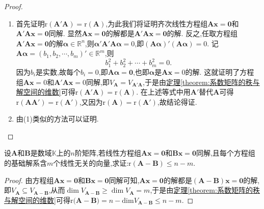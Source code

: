 \documentclass[lang=cn,newtx,10pt,scheme=chinese]{elegantbook}
\begin{document}
\begin{proof}
\begin{enumerate}[(1)]
\item 首先证明\(\mathrm{r}(\boldsymbol{A}'\boldsymbol{A})=\mathrm{r}(\boldsymbol{A})\),为此我们将证明齐次线性方程组\(\boldsymbol{A}\boldsymbol{x}=\boldsymbol{0}\)和\(\boldsymbol{A}'\boldsymbol{A}\boldsymbol{x}=\boldsymbol{0}\)同解. 显然\(\boldsymbol{A}\boldsymbol{x}=\boldsymbol{0}\)的解都是\(\boldsymbol{A}'\boldsymbol{A}\boldsymbol{x}=\boldsymbol{0}\)的解. 反之,任取方程组\(\boldsymbol{A}'\boldsymbol{A}\boldsymbol{x}=\boldsymbol{0}\)的解\(\boldsymbol{\alpha}\in\mathbb{R}^n\),则\(\boldsymbol{\alpha}'\boldsymbol{A}'\boldsymbol{A}\boldsymbol{\alpha}=0\),即\((\boldsymbol{A}\boldsymbol{\alpha})'(\boldsymbol{A}\boldsymbol{\alpha}) = 0\). 记\(\boldsymbol{A}\boldsymbol{\alpha}=(b_1,b_2,\cdots,b_m)'\in\mathbb{R}^m\),则
\[
b_1^2 + b_2^2+\cdots + b_m^2 = 0.
\]
因为\(b_i\)是实数,故每个\(b_i = 0\),即\(\boldsymbol{A}\boldsymbol{\alpha}=\boldsymbol{0}\),也即\(\boldsymbol{\alpha}\)是\(\boldsymbol{A}\boldsymbol{x}=0\)的解. 这就证明了方程组\(\boldsymbol{A}\boldsymbol{x}=0\)和\(\boldsymbol{A}'\boldsymbol{A}\boldsymbol{x}=0\)同解,即\(V_{\boldsymbol{A}}=V_{\boldsymbol{A}'\boldsymbol{A}}\),于是由\hyperref[theorem:系数矩阵的秩与解空间的维数]{定理\ref{theorem:系数矩阵的秩与解空间的维数}}可得\(\mathrm{r}(\boldsymbol{A}'\boldsymbol{A})=\mathrm{r}(\boldsymbol{A})\). 在上述等式中用\(\boldsymbol{A}'\)替代\(\boldsymbol{A}\)可得\(\mathrm{r}(\boldsymbol{A}\boldsymbol{A}')=\mathrm{r}(\boldsymbol{A}')\),又因为\(\mathrm{r}(\boldsymbol{A})=\mathrm{r}(\boldsymbol{A}')\),故结论得证.
        
\item 由(1)类似的方法可以证明.
\end{enumerate}
\end{proof}

\begin{example}
设\(\boldsymbol{A}\)和\(\boldsymbol{B}\)是数域\(\mathbb{K}\)上的\(n\)阶矩阵,若线性方程组\(\boldsymbol{A}\boldsymbol{x}=\boldsymbol{0}\)和\(\boldsymbol{B}\boldsymbol{x}=\boldsymbol{0}\)同解,且每个方程组的基础解系含\(m\)个线性无关的向量,求证:\(\mathrm{r}(\boldsymbol{A}-\boldsymbol{B})\leq n - m\).
\end{example}
\begin{proof}
由方程组\(\boldsymbol{A}\boldsymbol{x}=\boldsymbol{0}\)和\(\boldsymbol{B}\boldsymbol{x}=\boldsymbol{0}\)同解可知,\(\boldsymbol{A}\boldsymbol{x}=\boldsymbol{0}\)的解都是\((\boldsymbol{A}-\boldsymbol{B})\boldsymbol{x}=\boldsymbol{0}\)的解,即\(V_{\boldsymbol{A}}\subseteq V_{\boldsymbol{A}-\boldsymbol{B}}\),从而\(\dim V_{\boldsymbol{A}-\boldsymbol{B}}\geq\dim V_{\boldsymbol{A}} = m\),于是由\hyperref[theorem:系数矩阵的秩与解空间的维数]{定理\ref{theorem:系数矩阵的秩与解空间的维数}}可得$\mathrm{r(}\boldsymbol{A}-\boldsymbol{B})=n-\mathrm{dim}V_{\boldsymbol{A}-\boldsymbol{B}}\le n-m$.
\end{proof}
\end{document}
